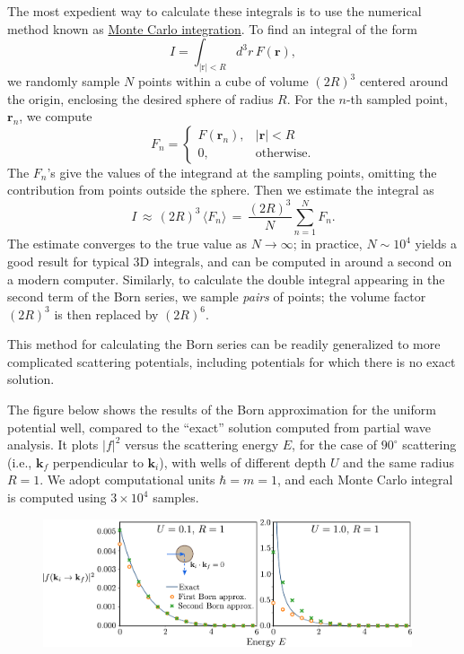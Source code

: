 \documentclass[pra,12pt]{revtex4}
\begin{document}
The most expedient way to calculate these integrals is to use the
numerical method known as
\href{https://en.wikipedia.org/wiki/Monte_Carlo_integration}{Monte
  Carlo integration}.  To find an integral of the form
\begin{equation}
  I = \int_{|\mathrm{r}|<R} d^3r \, F(\mathbf{r}),
\end{equation}
we randomly sample $N$ points within a cube of volume $(2R)^3$
centered around the origin, enclosing the desired sphere of radius
$R$.  For the $n$-th sampled point, $\mathbf{r}_n$, we compute
\begin{equation}
  F_n = \begin{cases}F(\mathbf{r}_n), & |\mathbf{r}| < R \\ 0, &\mathrm{otherwise}.\end{cases}
\end{equation}
The $F_n$'s give the values of the integrand at the sampling points,
omitting the contribution from points outside the sphere.  Then we
estimate the integral as
\begin{equation}
  I \,\approx\, (2R)^3 \, \langle F_n\rangle \,=\, \frac{(2R)^3}{N} \sum_{n=1}^N F_n.
\end{equation}
The estimate converges to the true value as $N\rightarrow\infty$; in
practice, $N \sim 10^4$ yields a good result for typical 3D integrals,
and can be computed in around a second on a modern computer.
Similarly, to calculate the double integral appearing in the second
term of the Born series, we sample \textit{pairs} of points; the
volume factor $(2R)^3$ is then replaced by $(2R)^6$.

This method for calculating the Born series can be readily generalized
to more complicated scattering potentials, including potentials for
which there is no exact solution.

The figure below shows the results of the Born approximation for the
uniform potential well, compared to the ``exact'' solution computed
from partial wave analysis.  It plots $|f|^2$ versus the scattering
energy $E$, for the case of $90^\circ$ scattering (i.e.,
$\mathbf{k}_f$ perpendicular to $\mathbf{k}_i$), with wells of
different depth $U$ and the same radius $R = 1$.  We adopt
computational units $\hbar = m = 1$, and each Monte Carlo integral is
computed using $3\times10^4$ samples.

\begin{figure}[h]
  \centering\includegraphics[width=0.97\textwidth]{spherical_well_scattering}
\end{figure}
\end{document}

